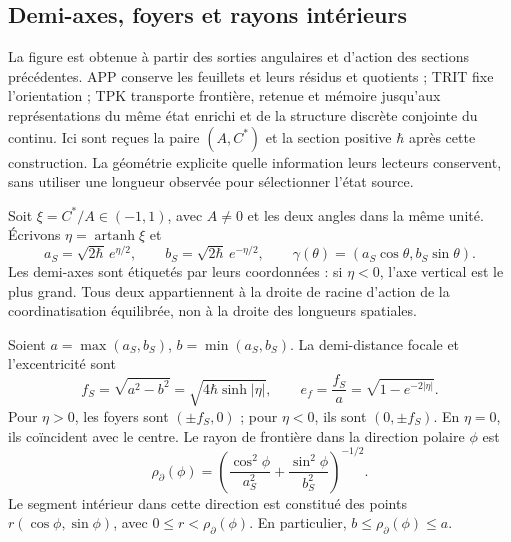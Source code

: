 
\subsection{Demi-axes, foyers et rayons intérieurs}
\label{sec:ii-elipse-geometria}

La figure est obtenue à partir des sorties angulaires et d’action des sections
précédentes. APP conserve les feuillets et leurs résidus et quotients ; TRIT fixe
l’orientation ; TPK transporte frontière, retenue et mémoire jusqu’aux
représentations du même état enrichi et de la structure discrète
conjointe du continu. Ici sont reçues la paire \((A,C^*)\) et la section
positive \(\hbar\) après cette construction. La géométrie explicite
quelle information leurs lecteurs conservent, sans utiliser une longueur observée
pour sélectionner l’état source.

Soit \(\xi=C^*/A\in(-1,1)\), avec \(A\ne0\) et les deux angles dans la
même unité. Écrivons \(\eta=\operatorname{artanh}\xi\) et
\[
 a_S=\sqrt{2\hbar}\,e^{\eta/2},\qquad
 b_S=\sqrt{2\hbar}\,e^{-\eta/2},\qquad
 \gamma(\theta)=(a_S\cos\theta,b_S\sin\theta).
\]
Les demi-axes sont étiquetés par leurs coordonnées : si \(\eta<0\),
l’axe vertical est le plus grand. Tous deux appartiennent à la droite de racine
d’action de la coordinatisation équilibrée, non à la droite des longueurs spatiales.

\begin{proposition}
\label{prop:ii-elipse-focos}
Soient \(a=\max(a_S,b_S)\), \(b=\min(a_S,b_S)\). La demi-distance
focale et l'excentricité sont
\begin{equation}
 f_S=\sqrt{a^2-b^2}
 =\sqrt{4\hbar\sinh|\eta|},\qquad
 e_f=\frac{f_S}{a}=\sqrt{1-e^{-2|\eta|}}.
 \label{eq:ii-elipse-focal}
\end{equation}
Pour \(\eta>0\), les foyers sont \((\pm f_S,0)\) ; pour
\(\eta<0\), ils sont \((0,\pm f_S)\). En \(\eta=0\), ils coïncident avec
le centre. Le rayon de frontière dans la direction polaire \(\phi\) est
\begin{equation}
 \rho_{\partial}(\phi)
 =\left(\frac{\cos^2\phi}{a_S^2}
        +\frac{\sin^2\phi}{b_S^2}\right)^{-1/2}.
 \label{eq:ii-elipse-radio-polar}
\end{equation}
Le segment intérieur dans cette direction est constitué des points
\(r(\cos\phi,\sin\phi)\), avec \(0\le r<\rho_{\partial}(\phi)\).
En particulier, \(b\le\rho_{\partial}(\phi)\le a\).
\end{proposition}

